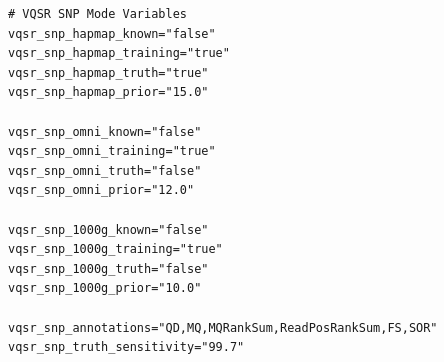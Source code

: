 \begin{tcolorbox}[
    breakable,  %
    colback=white!0,  %
    colframe=black,  %
    boxrule=1pt,  %
    arc=1mm,  %
    outer arc=1mm,
     title=\textbf{\refstepcounter{myboxcounter}\label{box:qv_variables_example}Box \themyboxcounter: Example QV variables - extract from QV1 variables file}
]

\begin{verbatim}
# VQSR SNP Mode Variables
vqsr_snp_hapmap_known="false"
vqsr_snp_hapmap_training="true"
vqsr_snp_hapmap_truth="true"
vqsr_snp_hapmap_prior="15.0"

vqsr_snp_omni_known="false"
vqsr_snp_omni_training="true"
vqsr_snp_omni_truth="false"
vqsr_snp_omni_prior="12.0"

vqsr_snp_1000g_known="false"
vqsr_snp_1000g_training="true"
vqsr_snp_1000g_truth="false"
vqsr_snp_1000g_prior="10.0"

vqsr_snp_annotations="QD,MQ,MQRankSum,ReadPosRankSum,FS,SOR"
vqsr_snp_truth_sensitivity="99.7"
\end{verbatim}
\end{tcolorbox}

